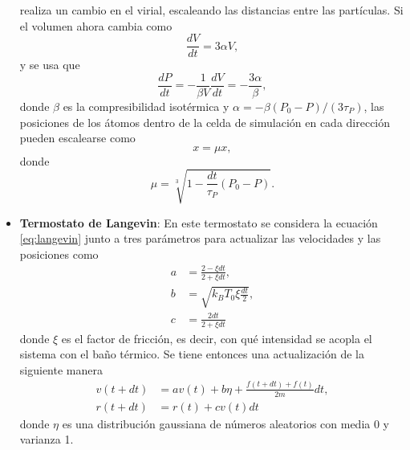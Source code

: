 \begin{itemize}
        realiza un cambio en el virial, escaleando las distancias entre las 
        partículas. Si el volumen ahora cambia como 
        \begin{equation}
            \frac{dV}{dt} = 3 \alpha V,
        \end{equation}
        y se usa que
        \begin{equation}
            \frac{dP}{dt} = - \frac{1}{\beta V} \frac{dV}{dt} = -\frac{3\alpha}{\beta},
        \end{equation}
        donde $\beta$ es la compresibilidad isotérmica y 
        $\alpha = - \beta (P_0 - P) / (3 \tau_P)$, las posiciones de los átomos 
        dentro de la celda de simulación en cada dirección pueden escalearse como
        \begin{equation}
            x = \mu x,
        \end{equation}
        donde
        \begin{equation}
        \mu = \sqrt[3]{1 - \frac{dt}{\tau_P} (P_0 - P)}.
        \end{equation}
    
    \item \textbf{Termostato de Langevin}:
        En este termostato se considera la ecuación \ref{eq:langevin} junto a 
        tres parámetros \cite{kroger2005} para actualizar las velocidades y 
        las posiciones como
        \begin{align}
            a &= \frac{2 - \xi dt}{2 + \xi dt}, \\
            b &= \sqrt{k_B T_0 \xi \frac{dt}{2}}, \\
            c &= \frac{2 dt}{2 + \xi dt}
        \end{align}
        donde $\xi$ es el factor de fricción, es decir, con qué intensidad se 
        acopla el sistema con el baño térmico. Se tiene entonces una 
        actualización de la siguiente manera
        \begin{align}
            v(t+dt) &= a v(t) + b \eta + \frac{f(t+dt)+f(t)}{2m} dt, \\
            r(t+dt) &= r(t) + c v(t) dt
        \end{align}
        donde $\eta$ es una distribución gaussiana de números aleatorios con 
        media 0 y varianza 1. 
    

\end{itemize}
